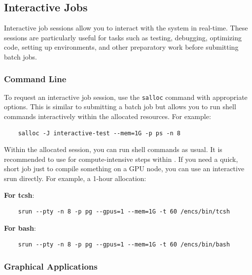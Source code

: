 \subsection{Interactive Jobs}
\label{sect:interactive-jobs}

Interactive job sessions allow you to interact with the system in real-time.
These sessions are particularly useful for tasks such as testing, debugging, optimizing code,
setting up environments, and other preparatory work before submitting batch jobs.

\subsubsection{Command Line}
\label{sect:command-line}

To request an interactive job session, use the \texttt{salloc} command with appropriate options.
This is similar to submitting a batch job but allows you to run shell commands interactively
within the allocated resources. For example:
\begin{verbatim}
	salloc -J interactive-test --mem=1G -p ps -n 8
\end{verbatim}

Within the allocated  session, you can run shell commands as usual.
It is recommended to use  for compute-intensive steps within .
If you need a quick, short job just to compile something on a GPU node,
you can use an interactive srun directly. For example, a 1-hour allocation:

\textbf{For tcsh}:
\begin{verbatim}
	srun --pty -n 8 -p pg --gpus=1 --mem=1G -t 60 /encs/bin/tcsh
\end{verbatim}
\textbf{For bash}:
\begin{verbatim}
	srun --pty -n 8 -p pg --gpus=1 --mem=1G -t 60 /encs/bin/bash
\end{verbatim}

\subsubsection{Graphical Applications}
\label{sect:graphical-applications}


